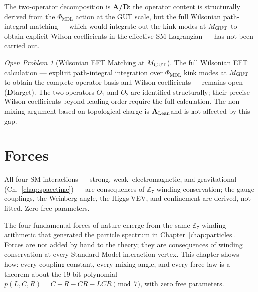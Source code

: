 \documentclass[11pt,openany]{book}
\theoremstyle{remark}
\newtheorem{openprob}{Open Problem}[chapter]
\newcommand{\GTE}{\text{GTE}}
\newcommand{\PHIMDL}{\Phi_{\mathrm{MDL}}}
\newcommand{\ZS}{\mathbb{Z}_7}
\newcommand{\CatAL}{\ensuremath{\textbf{A}_{\rm Lean}}}
\newcommand{\CatAD}{\textbf{A/D}}
\newcommand{\CatD}{\textbf{D}}
\begin{document}
The two-operator decomposition is \CatAD: the operator content is structurally
derived from the $\PHIMDL$ action at the GUT scale, but the full Wilsonian path-integral
matching --- which would integrate out the kink modes at $M_{\rm GUT}$ to obtain
explicit Wilson coefficients in the effective SM Lagrangian --- has not been carried out.

\begin{openprob}[Wilsonian EFT Matching at $M_{\rm GUT}$]
\label{oprob:eft_gut}
The full Wilsonian EFT calculation --- explicit path-integral integration over $\PHIMDL$
kink modes at $M_{\rm GUT}$ to obtain the complete operator basis and Wilson coefficients
--- remains open (\CatD target).  The two operators $O_1$ and $O_2$ are identified
structurally; their precise Wilson coefficients beyond leading order require the full
calculation.  The non-mixing argument based on topological charge is \CatAL and is
not affected by this gap.
\end{openprob}

\chapter{Forces}
\label{chap:forces}

\begin{tcolorbox}[colback=blue!5,colframe=blue!50!black,title={Chapter~7 Claim}]
All four SM interactions --- strong, weak, electromagnetic, and gravitational
(Ch.~\ref{chap:spacetime}) --- are consequences of $\ZS$ winding conservation; the gauge
couplings, the Weinberg angle, the Higgs VEV, and confinement are derived, not fitted.
Zero free parameters.
\end{tcolorbox}

The four fundamental forces of nature emerge from the same $\ZS$ winding arithmetic that
generated the particle spectrum in Chapter~\ref{chap:particles}.  Forces are not added by
hand to the theory; they are consequences of winding conservation at every Standard Model
interaction vertex.  This chapter shows how: every coupling constant, every mixing angle,
and every force law is a theorem about the 19-bit \GTE{} polynomial
$p(L,C,R) = C + R - CR - LCR \pmod{7}$, with zero free parameters.
\end{document}
